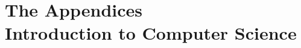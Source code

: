 \documentclass[a4paper,12pt]{book}
\begin{document}
\part[Appendices: Introduction to Computing]{The Appendices \\ \small{Introduction to Computer Science}}
		
	
		
	
	
	

\backmatter
\printindex


\end{document}
